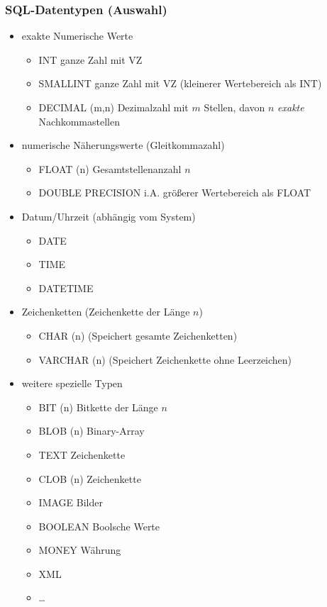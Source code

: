 \subsubsection{SQL-Datentypen (Auswahl)}
\begin{itemize}
\item exakte Numerische Werte
\begin{itemize}
\item INT ganze Zahl mit VZ
\item SMALLINT ganze Zahl mit VZ (kleinerer Wertebereich als INT)
\item DECIMAL (m,n) Dezimalzahl mit $m$ Stellen, davon $n$ \emph{exakte} Nachkommastellen
\end{itemize}
\item numerische Näherungswerte (Gleitkommazahl)
\begin{itemize}
\item FLOAT (n) Gesamtstellenanzahl $n$
\item DOUBLE PRECISION i.A. größerer Wertebereich als FLOAT
\end{itemize}
\item Datum/Uhrzeit (abhängig vom System)
\begin{itemize}
\item DATE
\item TIME
\item DATETIME
\end{itemize}
\item Zeichenketten (Zeichenkette der Länge $n$)
\begin{itemize}
\item CHAR (n) (Speichert gesamte Zeichenketten)
\item VARCHAR (n) (Speichert Zeichenkette ohne Leerzeichen)
\end{itemize}
\item weitere spezielle Typen
\begin{itemize}
\item BIT (n) Bitkette der Länge $n$
\item BLOB (n) Binary-Array
\item TEXT Zeichenkette
\item CLOB (n) Zeichenkette
\item IMAGE Bilder
\item BOOLEAN Boolsche Werte
\item MONEY Währung
\item XML
\item …
\end{itemize}
\end{itemize}
